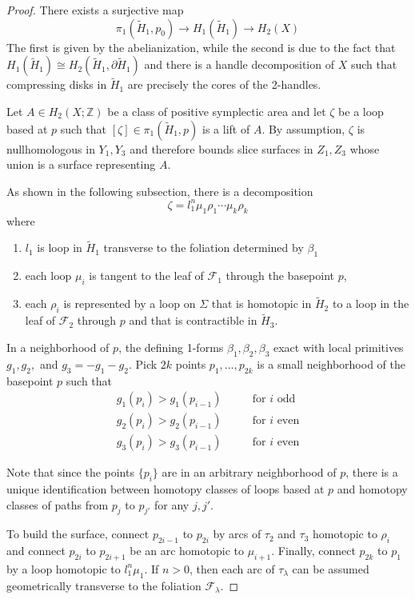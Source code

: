 \documentclass[11pt]{amsart}
\theoremstyle{definition}
\theoremstyle{remark}
\numberwithin{equation}{section}
\newcommand{\ZZ}{\mathbb{Z}}
\newcommand{\Ht}{\widetilde{H}}
\newcommand{\cF}{\mathcal{F}}
\newcommand{\del}{\partial}
\begin{document}
\begin{proof}
There exists a surjective map
\[\pi_1(\widetilde{H}_1,p_0) \rightarrow H_1(\widetilde{H}_1) \rightarrow H_2(X)\]
The first is given by the abelianization, while the second is due to the fact that $H_1(\widetilde{H}_1) \cong H_2(\widetilde{H}_1,\del \widetilde{H}_1)$ and there is a handle decomposition of $X$ such that compressing disks in $\widetilde{H}_1$ are precisely the cores of the 2-handles.

Let $A \in H_2(X;\ZZ)$ be a class of positive symplectic area and let $\zeta$ be a loop based at $p$ such that $[\zeta] \in \pi_1(\widetilde{H}_1,p)$ is a lift of $A$.  By assumption, $\zeta$ is nullhomologous in $Y_1,Y_3$ and therefore bounds slice surfaces in $Z_1,Z_3$ whose union is a surface representing $A$.  

As shown in the following subsection, there is a decomposition
\[ \zeta = l_1^n \mu_1 \rho_1 \cdots \mu_k \rho_k\]
where
\begin{enumerate}
    \item $l_1$ is loop in $\Ht_1$ transverse to the foliation determined by $\beta_1$
    \item each loop $\mu_i$ is tangent to the leaf of $\cF_1$ through the basepoint $p$,
    \item each $\rho_i$ is represented by a loop on $\Sigma$ that is homotopic in $\Ht_2$ to a loop in the leaf of $\cF_2$ through $p$ and that is contractible in $\Ht_3$.
\end{enumerate}

In a neighborhood of $p$, the defining 1-forms $\beta_1,\beta_2,\beta_3$ exact with local primitives $g_1,g_2,$ and $g_3 = -g_1 - g_2$.  Pick $2k$ points $p_1,\dots,p_{2k}$ is a small neighborhood of the basepoint $p$ such that
\begin{align*}
    g_1(p_i) > g_1(p_{i-1}) & &&\text{ for $i$ odd} \\
    g_2(p_i) > g_2(p_{i-1}) & && \text{ for $i$ even}\\
    g_3(p_i) > g_3(p_{i-1}) & &&\text{ for $i$ even}
\end{align*}

Note that since the points $\{p_i\}$ are in an arbitrary neighborhood of $p$, there is a unique identification between homotopy classes of loops based at $p$ and homotopy classes of paths from $p_j$ to $p_{j'}$ for any $j,j'$.

To build the surface, connect $p_{2i-1}$ to $p_{2i}$ by arcs of $\tau_2$ and $\tau_3$ homotopic to $\rho_i$ and connect $p_{2i}$ to $p_{2i+1}$ be an arc homotopic to $\mu_{i+1}$.  Finally, connect $p_{2k}$ to $p_1$ by a loop homotopic to $l_1^n \mu_1$.  If $n > 0$, then each arc of $\tau_{\lambda}$ can be assumed geometrically transverse to the foliation $\cF_{\lambda}$.  


\end{proof}
\end{document}
